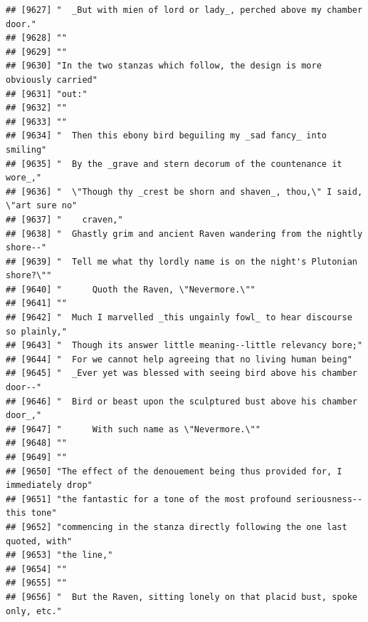 \documentclass{article}\usepackage[]{graphicx}\usepackage[]{color}
\makeatletter
\newenvironment{kframe}{%
 \def\at@end@of@kframe{}%
 \ifinner\ifhmode%
  \def\at@end@of@kframe{\end{minipage}}%
  \begin{minipage}{\columnwidth}%
 \fi\fi%
 \def\FrameCommand##1{\hskip\@totalleftmargin \hskip-\fboxsep
 \colorbox{shadecolor}{##1}\hskip-\fboxsep
     \hskip-\linewidth \hskip-\@totalleftmargin \hskip\columnwidth}%
 \MakeFramed {\advance\hsize-\width
   \@totalleftmargin\z@ \linewidth\hsize
   \@setminipage}}%
 {\par\unskip\endMakeFramed%
 \at@end@of@kframe}
\newenvironment{knitrout}{}{} %
\makeatother
\begin{document}
\begin{knitrout}
\begin{kframe}
\begin{verbatim}
## [9627] "  _But with mien of lord or lady_, perched above my chamber door."           
## [9628] ""                                                                            
## [9629] ""                                                                            
## [9630] "In the two stanzas which follow, the design is more obviously carried"       
## [9631] "out:"                                                                        
## [9632] ""                                                                            
## [9633] ""                                                                            
## [9634] "  Then this ebony bird beguiling my _sad fancy_ into smiling"                
## [9635] "  By the _grave and stern decorum of the countenance it wore_,"              
## [9636] "  \"Though thy _crest be shorn and shaven_, thou,\" I said, \"art sure no"   
## [9637] "    craven,"                                                                 
## [9638] "  Ghastly grim and ancient Raven wandering from the nightly shore--"         
## [9639] "  Tell me what thy lordly name is on the night's Plutonian shore?\""         
## [9640] "      Quoth the Raven, \"Nevermore.\""                                       
## [9641] ""                                                                            
## [9642] "  Much I marvelled _this ungainly fowl_ to hear discourse so plainly,"       
## [9643] "  Though its answer little meaning--little relevancy bore;"                  
## [9644] "  For we cannot help agreeing that no living human being"                    
## [9645] "  _Ever yet was blessed with seeing bird above his chamber door--"           
## [9646] "  Bird or beast upon the sculptured bust above his chamber door_,"           
## [9647] "      With such name as \"Nevermore.\""                                      
## [9648] ""                                                                            
## [9649] ""                                                                            
## [9650] "The effect of the denouement being thus provided for, I immediately drop"    
## [9651] "the fantastic for a tone of the most profound seriousness--this tone"        
## [9652] "commencing in the stanza directly following the one last quoted, with"       
## [9653] "the line,"                                                                   
## [9654] ""                                                                            
## [9655] ""                                                                            
## [9656] "  But the Raven, sitting lonely on that placid bust, spoke only, etc."       

\end{verbatim}
\end{kframe}
\end{knitrout}
\end{document}
